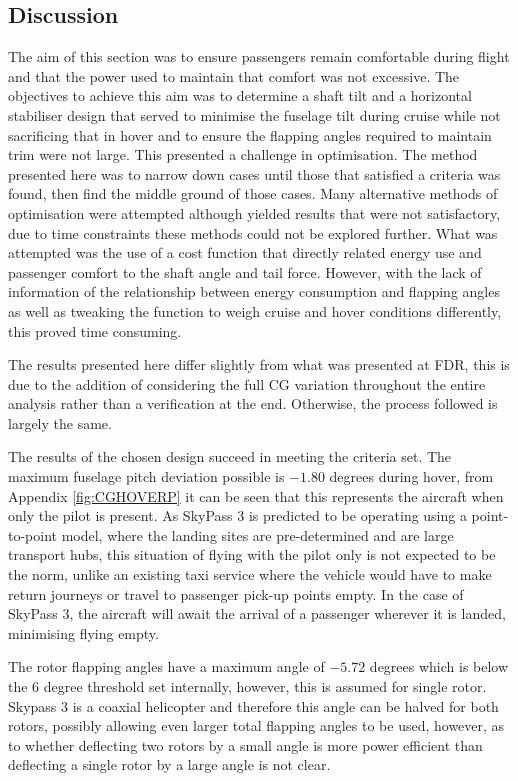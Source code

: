 \documentclass[11pt,a4paper]{article}
\begin{document}
\subsection{Discussion}
The aim of this section was to ensure passengers remain comfortable during flight and that the power used to maintain that comfort was not excessive. 
The objectives to achieve this aim was to determine a shaft tilt and a horizontal stabiliser design that served to minimise the fuselage tilt during cruise while not sacrificing that in hover and to ensure the flapping angles required to maintain trim were not large. This presented a challenge in optimisation. The method presented here was to narrow down cases until those that satisfied a criteria was found, then find the middle ground of those cases. Many alternative methods of optimisation were attempted although yielded results that were not satisfactory, due to time constraints these methods could not be explored further. What was attempted was the use of a cost function that directly related energy use and passenger comfort to the shaft angle and tail force. However, with the lack of information of the relationship between energy consumption and flapping angles as well as tweaking the function to weigh cruise and hover conditions differently, this proved time consuming. 

The results presented here differ slightly from what was presented at FDR, this is due to the addition of considering the full CG variation throughout the entire analysis rather than a verification at the end. Otherwise, the process followed is largely the same. 

The results of the chosen design succeed in meeting the criteria set. The maximum fuselage pitch deviation possible is $-1.80$ degrees during hover, from Appendix \ref{fig:CGHOVERP} it can be seen that this represents the aircraft when only the pilot is present. As SkyPass 3 is predicted to be operating using a point-to-point model, where the landing sites are pre-determined and are large transport hubs, this situation of flying with the pilot only is not expected to be the norm, unlike an existing taxi service where the vehicle would have to make return journeys or travel to passenger pick-up points empty. In the case of SkyPass 3, the aircraft will await the arrival of a passenger wherever it is landed, minimising flying empty.

The rotor flapping angles have a maximum angle of $-5.72$ degrees which is below the $6$ degree threshold set internally, however, this is assumed for single rotor. Skypass 3 is a coaxial helicopter and therefore this angle can be halved for both rotors, possibly allowing even larger total flapping angles to be used, however, as to whether deflecting two rotors by a small angle is more power efficient than deflecting a single rotor by a large angle is not clear.
\end{document}

